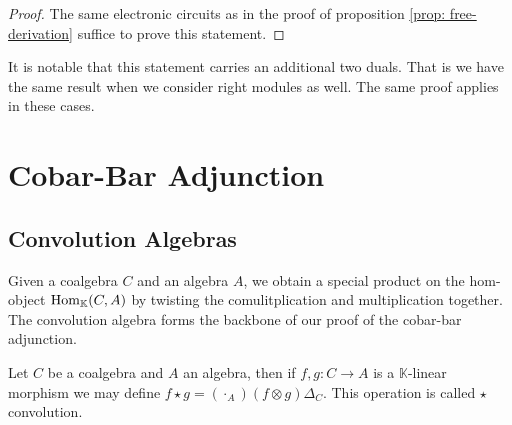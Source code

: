 \documentclass[../thesis.tex]{subfiles}
\begin{document}
            \begin{proof}
                The same electronic circuits as in the proof of proposition \ref{prop: free-derivation} suffice to prove this statement.
            \end{proof}

            It is notable that this statement carries an additional two duals. That is we have the same result when we consider right modules as well. The same proof applies in these cases.
    \section{Cobar-Bar Adjunction}
    \subsection{Convolution Algebras}

            Given a coalgebra $C$ and an algebra $A$, we obtain a special product on the hom-object $\tt{Hom}_\mathbb{K}(C,A)$ by twisting the comulitplication and multiplication together. The convolution algebra forms the backbone of our proof of the cobar-bar adjunction.

            Let $C$ be a coalgebra and $A$ an algebra, then if $f,g:C\rightarrow A$ is a $\mathbb{K}$-linear morphism we may define $f\star g = (\cdot_A)(f\otimes g)\Delta_C$. This operation is called $\star$ convolution.

            \begin{center}
            \end{center}
\end{document}
